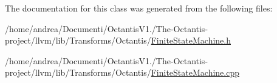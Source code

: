 The documentation for this class was generated from the following files\+:\begin{DoxyCompactItemize}
\item 
/home/andrea/\+Documenti/\+Octantis\+V1./\+The-\/\+Octantis-\/project/llvm/lib/\+Transforms/\+Octantis/\hyperlink{FiniteStateMachine_8h}{Finite\+State\+Machine.\+h}\item 
/home/andrea/\+Documenti/\+Octantis\+V1./\+The-\/\+Octantis-\/project/llvm/lib/\+Transforms/\+Octantis/\hyperlink{FiniteStateMachine_8cpp}{Finite\+State\+Machine.\+cpp}\end{DoxyCompactItemize}
